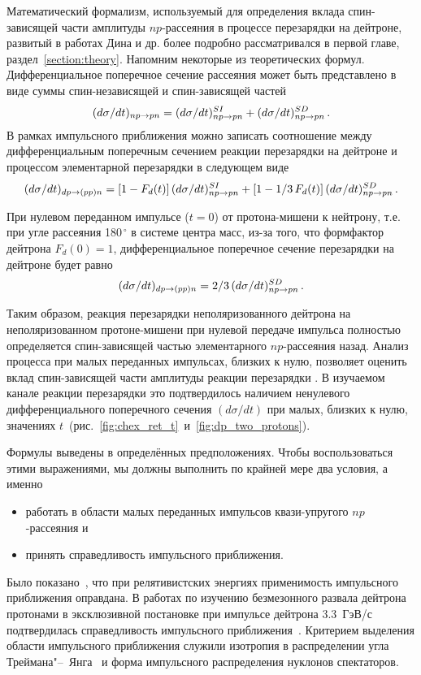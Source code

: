 Математический формализм, используемый для определения вклада спин-зависящей
части амплитуды $np$-рассеяния в процессе перезарядки на дейтроне, развитый в
работах Дина и др. более подробно рассматривался в первой главе,
раздел~\ref{section:theory}. Напомним некоторые из теоретических формул.
Дифференциальное поперечное сечение \np рассеяния может быть представлено в виде
суммы спин-независящей и спин-зависящей частей
\begin{equation}
  \label{eq:np}
  (d\sigma/dt)_{np \rightarrow pn} = (d\sigma/dt)^{SI}_{np \rightarrow pn} + (d\sigma/dt)^{SD}_{np \rightarrow pn}\,.
\end{equation}
В рамках импульсного приближения можно записать соотношение между
дифференциальным поперечным сечением реакции перезарядки на дейтроне \dpchex и
процессом элементарной перезарядки \np в следующем виде
\begin{equation}
  \label{eq:dpnp}
  (d\sigma/dt)_{dp \rightarrow (pp)n} = [1-F_d(t)]\,(d\sigma/dt)^{SI}_{np \rightarrow pn} +
        [1-1/3\,F_d(t)]\,(d\sigma/dt)^{SD}_{np \rightarrow pn}\,.
\end{equation}

При нулевом переданном импульсе ($t=0$) от протона-мишени к нейтрону, т.е. при
угле рассеяния 180$^{\,\circ}$ в системе центра масс, из-за того, что формфактор
дейтрона $F_d(0) = 1$, дифференциальное поперечное сечение перезарядки на
дейтроне будет равно
\begin{equation}
  \label{eq:dpnp0}
  (d\sigma/dt)_{dp \rightarrow (pp)n} = 2/3\,(d\sigma/dt)^{SD}_{np \rightarrow pn}\,.
\end{equation}

Таким образом, реакция перезарядки неполяризованного дейтрона на
неполяризованном протоне-мишени при нулевой передаче импульса полностью
определяется спин-зависящей частью элементарного $np$-рассеяния назад. Анализ
процесса \dpchex при малых переданных импульсах, близких к нулю, позволяет
оценить вклад спин-зависящей части амплитуды реакции перезарядки \np. В
изучаемом канале реакции перезарядки это подтвердилось наличием ненулевого
дифференциального поперечного сечения $(d\sigma/dt)$ при малых, близких к нулю,
значениях $t$~(рис.~\ref{fig:chex_ret_t}~и~\ref{fig:dp_two_protons}).

Формулы выведены в определённых предположениях. Чтобы воспользоваться этими
выражениями, мы должны выполнить по крайней мере два условия, а именно
\begin{itemize}
\item работать в области малых переданных импульсов квази-упругого
  $np$-рассеяния и
\item принять справедливость импульсного приближения.
\end{itemize}
Было показано~\cite{glagolev99,led04}, что при релятивистских энергиях
применимость импульсного приближения оправдана. В работах по изучению
безмезонного развала дейтрона протонами в эксклюзивной постановке при импульсе
дейтрона 3.3~ГэВ/с подтвердилась справедливость импульсного
приближения~\cite{alad75_4,alad77_2,glagolev73}. Критерием выделения
области импульсного приближения служили изотропия в распределении угла
Треймана"--~Янга~\cite{trei62} и форма импульсного распределения нуклонов
спектаторов.

